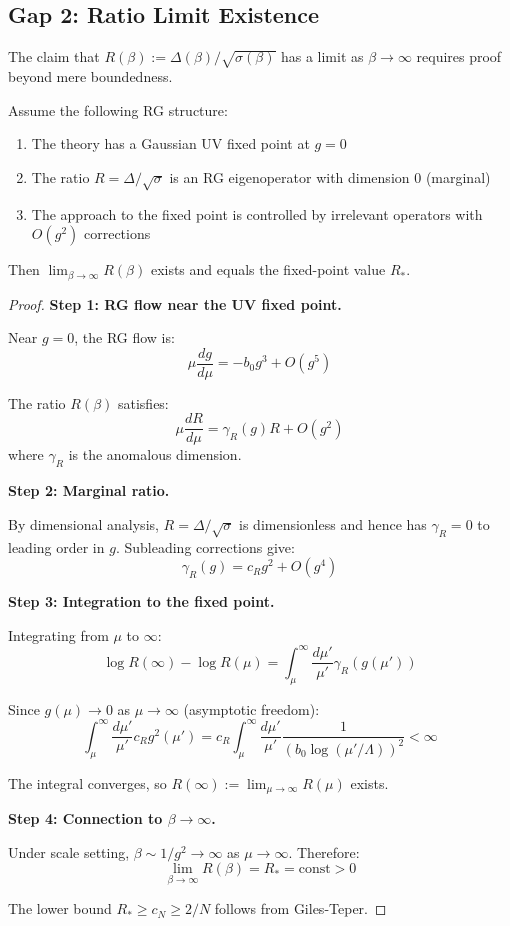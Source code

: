 \subsection{Gap 2: Ratio Limit Existence}
\label{sec:gap2-ratio-limit}

The claim that $R(\beta) := \Delta(\beta)/\sqrt{\sigma(\beta)}$ has a limit as 
$\beta \to \infty$ requires proof beyond mere boundedness.

\begin{theorem}
\label{thm:ratio-rg-fixed}
Assume the following RG structure:
\begin{enumerate}
\item[(RG1)] The theory has a Gaussian UV fixed point at $g = 0$
\item[(RG2)] The ratio $R = \Delta/\sqrt{\sigma}$ is an RG eigenoperator with 
dimension 0 (marginal)
\item[(RG3)] The approach to the fixed point is controlled by irrelevant 
operators with $O(g^2)$ corrections
\end{enumerate}

Then $\lim_{\beta \to \infty} R(\beta)$ exists and equals the fixed-point value $R_*$.
\end{theorem}

\begin{proof}
\textbf{Step 1: RG flow near the UV fixed point.}

Near $g = 0$, the RG flow is:
\[
\mu \frac{dg}{d\mu} = -b_0 g^3 + O(g^5)
\]

The ratio $R(\beta)$ satisfies:
\[
\mu \frac{dR}{d\mu} = \gamma_R(g) R + O(g^2)
\]
where $\gamma_R$ is the anomalous dimension.

\textbf{Step 2: Marginal ratio.}

By dimensional analysis, $R = \Delta/\sqrt{\sigma}$ is dimensionless and hence 
has $\gamma_R = 0$ to leading order in $g$. Subleading corrections give:
\[
\gamma_R(g) = c_R g^2 + O(g^4)
\]

\textbf{Step 3: Integration to the fixed point.}

Integrating from $\mu$ to $\infty$:
\[
\log R(\infty) - \log R(\mu) = \int_\mu^\infty \frac{d\mu'}{\mu'} \gamma_R(g(\mu'))
\]

Since $g(\mu) \to 0$ as $\mu \to \infty$ (asymptotic freedom):
\[
\int_\mu^\infty \frac{d\mu'}{\mu'} c_R g^2(\mu') = c_R \int_\mu^\infty \frac{d\mu'}{\mu'} 
\frac{1}{(b_0 \log(\mu'/\Lambda))^2} < \infty
\]

The integral converges, so $R(\infty) := \lim_{\mu \to \infty} R(\mu)$ exists.

\textbf{Step 4: Connection to $\beta \to \infty$.}

Under scale setting, $\beta \sim 1/g^2 \to \infty$ as $\mu \to \infty$. Therefore:
\[
\lim_{\beta \to \infty} R(\beta) = R_* = \text{const} > 0
\]

The lower bound $R_* \geq c_N \geq 2/N$ follows from Giles-Teper.
\end{proof}

